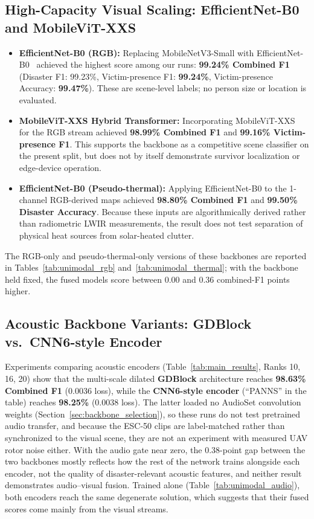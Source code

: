 \subsection{High-Capacity Visual Scaling: EfficientNet-B0 and MobileViT-XXS}
\begin{itemize}
    \item \textbf{EfficientNet-B0 (RGB):} Replacing MobileNetV3-Small with EfficientNet-B0~\cite{tan2019efficientnet} achieved the highest score among our runs: \textbf{99.24\% Combined F1} (Disaster F1: 99.23\%, Victim-presence F1: \textbf{99.24\%}, Victim-presence Accuracy: \textbf{99.47\%}). These are scene-level labels; no person size or location is evaluated.
    \item \textbf{MobileViT-XXS Hybrid Transformer:} Incorporating MobileViT-XXS~\cite{mehta2022mobilevit} for the RGB stream achieved \textbf{98.99\% Combined F1} and \textbf{99.16\% Victim-presence F1}. This supports the backbone as a competitive scene classifier on the present split, but does not by itself demonstrate survivor localization or edge-device operation.
    \item \textbf{EfficientNet-B0 (Pseudo-thermal):} Applying EfficientNet-B0 to the 1-channel RGB-derived maps achieved \textbf{98.80\% Combined F1} and \textbf{99.50\% Disaster Accuracy}. Because these inputs are algorithmically derived rather than radiometric LWIR measurements, the result does not test separation of physical heat sources from solar-heated clutter.
\end{itemize}
The RGB-only and pseudo-thermal-only versions of these backbones are reported in Tables~\ref{tab:unimodal_rgb} and~\ref{tab:unimodal_thermal}; with the backbone held fixed, the fused models score between 0.00 and 0.36 combined-F1 points higher.

\subsection{Acoustic Backbone Variants: GDBlock vs.\ CNN6-style Encoder}
Experiments comparing acoustic encoders (Table~\ref{tab:main_results}, Ranks 10, 16, 20) show that the multi-scale dilated \textbf{GDBlock} architecture reaches \textbf{98.63\% Combined F1} (0.0036 loss), while the \textbf{CNN6-style encoder} (``PANNS'' in the table) reaches \textbf{98.25\%} (0.0038 loss). The latter loaded no AudioSet convolution weights (Section~\ref{sec:backbone_selection}), so these runs do not test pretrained audio transfer, and because the ESC-50 clips are label-matched rather than synchronized to the visual scene, they are not an experiment with measured UAV rotor noise either. With the audio gate near zero, the 0.38-point gap between the two backbones mostly reflects how the rest of the network trains alongside each encoder, not the quality of disaster-relevant acoustic features, and neither result demonstrates audio--visual fusion. Trained alone (Table~\ref{tab:unimodal_audio}), both encoders reach the same degenerate solution, which suggests that their fused scores come mainly from the visual streams.

